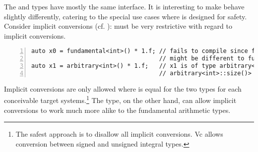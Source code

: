 The  and  types have mostly the same interface.
It is interesting to make  behave slightly differently, catering to the special use cases where  is designed for safety.
Consider implicit conversions (cf. ):  must be very restrictive with regard to implicit conversions.
\begin{lstlisting}[style=Vc,numbers=left,float,label=lst:implicit conversion,caption={
  Implicit conversions behave differently for \type{fundamental} and \type{arbitrary}.
}]
auto x0 = fundamental<int>() * 1.f; // fails to compile since fundamental<int>::size()
                                    // might be different to fundamental<float>::size()
auto x1 = arbitrary<int>() * 1.f;   // x1 is of type arbitrary<float,
                                    // arbitrary<int>::size()>
\end{lstlisting}
Implicit conversions are only allowed where  is equal for the two types for each conceivable target systems.\footnote{
  The safest approach is to disallow all implicit conversions.
  Vc allows conversion between signed and unsigned integral types.
}
The  type, on the other hand, can allow implicit conversions to work much more alike to the fundamental arithmetic types.
